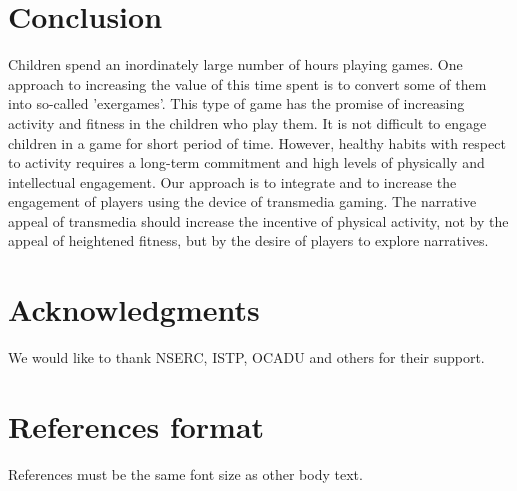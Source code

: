 \documentclass{SIGCHI2015LaTex/sigchi}
\begin{document}
\section{Conclusion}
Children spend an inordinately large number of hours playing games. One approach to increasing the value of this time spent is to convert some of them into so-called 'exergames'. This type of game has the promise of increasing activity and fitness in the children who play them. It is not difficult to engage children in a game for short period of time. However, healthy habits with respect to activity requires a long-term commitment and high levels of physically and intellectual engagement. Our approach is to integrate and to increase the engagement of players using the device of transmedia gaming. The narrative appeal of transmedia should increase the incentive of physical activity, not by the appeal of heightened fitness, but by the desire of players to explore narratives. 

\section{Acknowledgments}

We would like to thank NSERC, ISTP, OCADU and others for their support.

%
%
%
%
%
\balance

\section{References format}
References must be the same font size as other body text.



\end{document}

